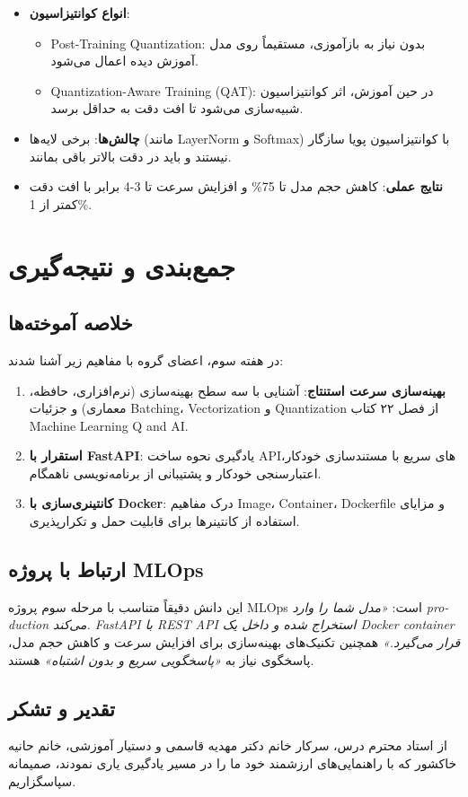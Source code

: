 \documentclass[12pt,a4paper]{report}
\newcommand{\eng}[1]{\textenglish{#1}}
\begin{document}
	\begin{itemize}
		\item \textbf{انواع کوانتیزاسیون}:
		\begin{itemize}
			\item \eng{Post-Training Quantization}: بدون نیاز به بازآموزی، مستقیماً روی مدل آموزش دیده اعمال می‌شود.
			\item \eng{Quantization-Aware Training (QAT)}: در حین آموزش، اثر کوانتیزاسیون شبیه‌سازی می‌شود تا افت دقت به حداقل برسد.
		\end{itemize}
		\item \textbf{چالش‌ها}: برخی لایه‌ها (مانند \eng{LayerNorm} و \eng{Softmax}) با کوانتیزاسیون پویا سازگار نیستند و باید در دقت بالاتر باقی بمانند.
		\item \textbf{نتایج عملی}: کاهش حجم مدل تا \eng{75\%} و افزایش سرعت تا \eng{3-4} برابر با افت دقت کمتر از \eng{1\%}.
	\end{itemize}
	
	\chapter{جمع‌بندی و نتیجه‌گیری}
	
	\section{خلاصه آموخته‌ها}
	در هفته سوم، اعضای گروه با مفاهیم زیر آشنا شدند:
	
	\begin{enumerate}
		\item \textbf{بهینه‌سازی سرعت استنتاج}: آشنایی با سه سطح بهینه‌سازی (نرم‌افزاری، حافظه، معماری) و جزئیات \eng{Batching}، \eng{Vectorization} و \eng{Quantization} از فصل ۲۲ کتاب \eng{Machine Learning Q and AI}.
		\item \textbf{استقرار با \eng{FastAPI}}: یادگیری نحوه ساخت \eng{API}های سریع با مستندسازی خودکار، اعتبارسنجی خودکار و پشتیبانی از برنامه‌نویسی ناهمگام.
		\item \textbf{کانتینری‌سازی با \eng{Docker}}: درک مفاهیم \eng{Image}، \eng{Container}، \eng{Dockerfile} و مزایای استفاده از کانتینرها برای قابلیت حمل و تکرارپذیری.
	\end{enumerate}
	
	\section{ارتباط با پروژه \eng{MLOps}}
	این دانش دقیقاً متناسب با مرحله سوم پروژه \eng{MLOps} است: \emph{«مدل شما را وارد \eng{production} می‌کند. \eng{FastAPI} با \eng{REST API} استخراج شده و داخل یک \eng{Docker container} قرار می‌گیرد.»} همچنین تکنیک‌های بهینه‌سازی برای افزایش سرعت و کاهش حجم مدل، پاسخگوی نیاز به \emph{«پاسخگویی سریع و بدون اشتباه»} هستند.
	
	\section{تقدیر و تشکر}
	از استاد محترم درس، سرکار خانم دکتر مهدیه قاسمی و دستیار آموزشی، خانم حانیه خاکشور که با راهنمایی‌های ارزشمند خود ما را در مسیر یادگیری یاری نمودند، صمیمانه سپاسگزاریم.
	
\end{document}
